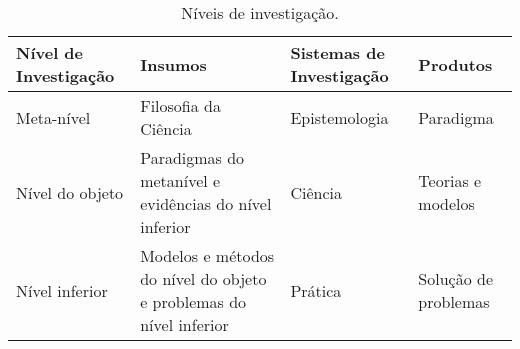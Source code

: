 \begin{table}[htb]
\end{table}

\begin{table}[ht]
	\ABNTEXfontereduzida
	\caption[Níveis de investigação]{Níveis de investigação.}
	\label{tab-nivinv}
	\begin{tabular}{p{2.6cm}|p{6.0cm}|p{2.25cm}|p{3.40cm}}
		\textbf{Nível de In\-ves\-ti\-ga\-ção} & \textbf{Insumos}                                                      & \textbf{Sis\-te\-mas de In\-ves\-ti\-ga\-ção} & \textbf{Produtos}      \\
		\hline
		Meta-nível                               & Filosofia\index{filosofia} da Ciência                                & Epistemologia                                   &                        
		Paradigma  \\
		\hline
		Nível do objeto & Paradigmas do metanível e evidências do nível inferior &
		Ciência  & Teorias e modelos \\
		\hline
		Nível inferior                           & Modelos e métodos do nível do objeto e problemas do nível inferior & Prática                                        & Solução de problemas \\
	\end{tabular}
\end{table}


